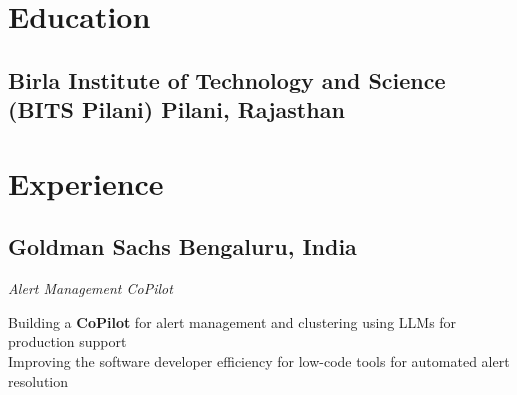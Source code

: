 \documentclass[a4paper]{Resume}
\begin{document}

\descript{}

\section{Education}
\hrulefill

\subsection{Birla Institute of Technology and Science (BITS Pilani) \hfill \normalfont Pilani, Rajasthan}
\sectionsep


\section{Experience} 
\hrulefill 

\subsection{Goldman Sachs \hfill \normalfont Bengaluru, India}

\textit{Alert Management CoPilot}

\pt Building a \textbf{CoPilot} for alert management and clustering using LLMs for production support \\
\pt Improving the software developer efficiency for low-code tools for automated alert resolution \\
\end{document}
